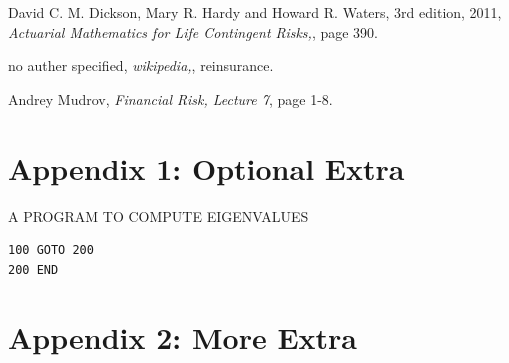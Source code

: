 \documentclass{report}
\begin{document}
\begin{thebibliography}{99}
  David C. M. Dickson, Mary R. Hardy and Howard R. Waters,
    3rd edition, 2011, 
    {\em Actuarial Mathematics for Life Contingent Risks,},
    page 390.

  no auther specified,
    {\em wikipedia,},
    reinsurance.

  Andrey Mudrov,
    {\em Financial Risk, Lecture 7},
    page 1-8.











\end{thebibliography}


\chapter*{Appendix 1: Optional Extra}

\begin{center}
   {\Large A PROGRAM TO COMPUTE EIGENVALUES}
\end{center}

\begin{verbatim}    
100 GOTO 200
200 END
\end{verbatim}    

\chapter*{Appendix 2: More Extra}


%
%
\newcommand{\X}[1]{$#1$&\texttt{\string#1}\hspace*{1ex}}
\newsavebox{\symbbox}
\newenvironment{symbols}[1]%
{\par\vspace*{2ex}
\begin{lrbox}{\symbbox}
\hspace*{4ex}\begin{tabular}{@{}#1@{}}}%
{\end{tabular}\end{lrbox}\makebox[\textwidth]{\usebox{\symbbox}}\par\medskip}
\end{document}
